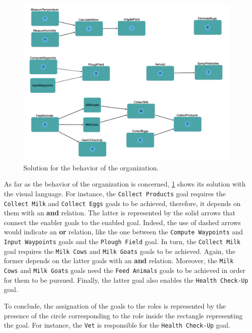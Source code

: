 \begin{figure}[H]
    \centering
    \includegraphics[width=\textwidth]{images/solution-functional.png}
    \caption{Solution for the behavior of the organization.}
    \label{fig:solution-functional}
\end{figure}

As far as the behavior of the organization is concerned, \cref{fig:solution-functional} shows its solution with the visual language.
For instance, the \texttt{Collect Products} goal requires the \texttt{Collect Milk} and \texttt{Collect Eggs} goals to be achieved, therefore, it depends on them with an \textbf{and} relation.
The latter is represented by the solid arrows that connect the enabler goals to the enabled goal.
Indeed, the use of dashed arrows would indicate an \textbf{or} relation, like the one between the \texttt{Compute Waypoints} and \texttt{Input Waypoints} goals and the \texttt{Plough Field} goal.
In turn, the \texttt{Collect Milk} goal requires the \texttt{Milk Cows} and \texttt{Milk Goats} goals to be achieved.
Again, the former depends on the latter goals with an \textbf{and} relation.
Moreover, the \texttt{Milk Cows} and \texttt{Milk Goats} goals need the \texttt{Feed Animals} goals to be achieved in order for them to be pursued.
Finally, the latter goal also enables the \texttt{Health Check-Up} goal.

To conclude, the assignation of the goals to the roles is represented by the presence of the circle corresponding to the role inside the rectangle representing the goal.
For instance, the \texttt{Vet} is responsible for the \texttt{Health Check-Up} goal.

